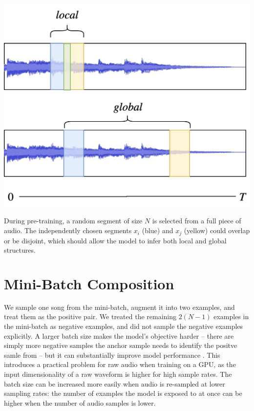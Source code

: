\begin{marginfigure}
    \includegraphics[width=\textwidth]{figs/clmr_local_global.png}
    \caption{During pre-training, a random segment of size $N$ is selected from a full piece of audio. The independently chosen segments $x_i$ (blue) and $x_j$ (yellow) could overlap or be disjoint, which should allow the  model to infer both local  and global structures.}
    \label{fig:global_local}
\end{marginfigure}



\section{Mini-Batch Composition} %
We sample one song from the mini-batch, augment it into two examples, and treat them as the positive pair.
We treated the remaining $2(N-1)$ examples in the mini-batch as negative examples, and did not sample the negative examples explicitly.
A larger batch size makes the model's objective harder -- there are simply more negative samples the anchor sample needs to identify the positve samle from -- but it can substantially improve model performance \cite{chen_simple_2020}.
This introduces a practical problem for raw audio when training on a GPU, as the input dimensionality of a raw waveform is higher for high sample rates.
The batch size can be increased more easily when audio is re-sampled at lower sampling rates: the number of examples the model is exposed to at once can be higher when the number of audio samples is lower.

